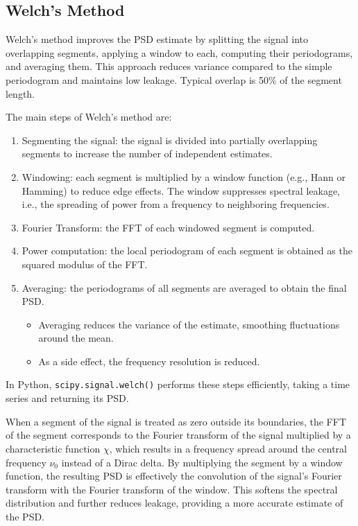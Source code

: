 \subsection{Welch's Method}

Welch's method improves the PSD estimate by splitting the signal into overlapping segments, applying a window to each, computing their periodograms, and averaging them. This approach reduces variance compared to the simple periodogram and maintains low leakage. Typical overlap is 50\% of the segment length.

The main steps of Welch's method are:

\begin{enumerate}
    \item Segmenting the signal: the signal is divided into partially overlapping segments to increase the number of independent estimates.
    \item Windowing: each segment is multiplied by a window function (e.g., Hann or Hamming) to reduce edge effects. The window suppresses spectral leakage, i.e., the spreading of power from a frequency to neighboring frequencies.
    \item Fourier Transform: the FFT of each windowed segment is computed.
    \item Power computation: the local periodogram of each segment is obtained as the squared modulus of the FFT.
    \item Averaging: the periodograms of all segments are averaged to obtain the final PSD.
    \begin{itemize}
        \item Averaging reduces the variance of the estimate, smoothing fluctuations around the mean.
        \item As a side effect, the frequency resolution is reduced.
    \end{itemize}
\end{enumerate}

In Python, \texttt{scipy.signal.welch()} performs these steps efficiently, taking a time series and returning its PSD.

When a segment of the signal is treated as zero outside its boundaries, the FFT of the segment corresponds to the Fourier transform of the signal multiplied by a characteristic function $\chi$, which results in a frequency spread around the central frequency $\nu_0$ instead of a Dirac delta. By multiplying the segment by a window function, the resulting PSD is effectively the convolution of the signal's Fourier transform with the Fourier transform of the window. This softens the spectral distribution and further reduces leakage, providing a more accurate estimate of the PSD.

